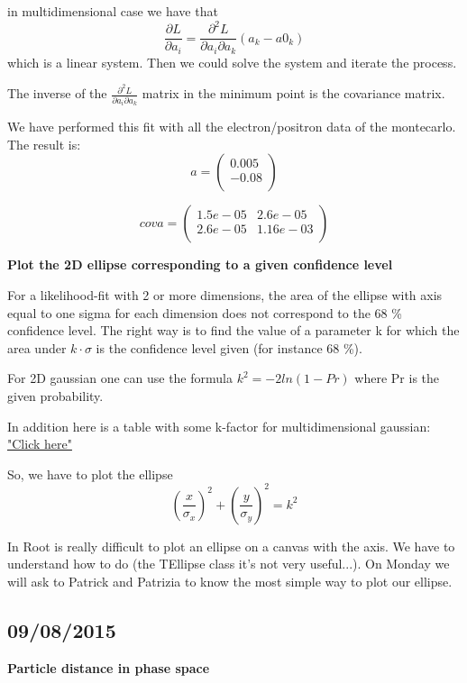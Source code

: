 in multidimensional case we have that 
\[ \frac{\partial L}{\partial a_i} = \frac{\partial ^2 L}{\partial a_i \partial a_k} (a_k - a0_k)\]
which is a linear system. Then we could solve the system and iterate the process.

The inverse of the $\frac{\partial^2 L}{\partial a_i \partial a_k}$ matrix in the minimum point is the covariance matrix.

We have performed this fit with all the electron/positron data of the montecarlo. The result is:
\[ 
a=\left(
\begin{array}{c}
0.005\\
-0.08\\
\end{array} 
\right)
\]

\[
cova=\left(
\begin{array}{cc}
1.5e-05 & 2.6e-05\\
2.6e-05 & 1.16e-03\\
\end{array}
\right)
\]

\textbf{Plot the 2D ellipse corresponding to a given confidence level}

For a likelihood-fit with 2 or more dimensions, the area of the ellipse with axis equal to one sigma for each dimension does not correspond to the 68 \% confidence level. The right way is to find the value of a parameter k for which the area under $k \cdot \sigma$ is the confidence level given (for instance 68 \%).

For 2D gaussian one can use the formula $k^2=-2 ln(1-Pr)$ where Pr is the given probability.

In addition here is a table with some k-factor for multidimensional gaussian: \href{https://people.richland.edu/james/lecture/m170/tbl-chi.html}{"Click here"}

So, we have to plot the ellipse \[\left(\frac{x}{\sigma_x}\right)^2 + \left(\frac{y}{\sigma_y}\right)^2 = k^2 \]

In Root is really difficult to plot an ellipse on a canvas with the axis. We have to understand how to do (the TEllipse class it's not very useful...). On Monday we will ask to Patrick and Patrizia to know the most simple way to plot our ellipse.

\subsection{09/08/2015}

\textbf{Particle distance in phase space}

